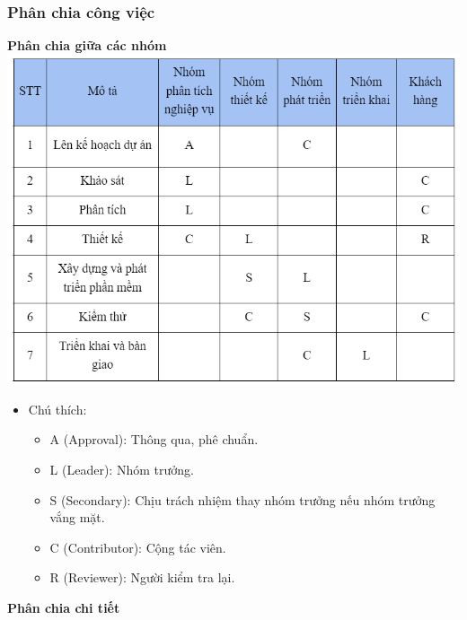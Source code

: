 \documentclass[12pt]{article}
\begin{document}
\subsubsection{Phân chia công việc}
\hspace{1cm}\textbf{Phân chia giữa các nhóm \\}
\includegraphics[width=15cm]{II_6_5_1.png}
\begin{itemize}[label=, leftmargin=1cm]
    \item Chú thích:
    \begin{itemize}[label=1, leftmargin=1cm]
        \item A (Approval): Thông qua, phê chuẩn.
        \item L (Leader): Nhóm trưởng.
        \item S (Secondary): Chịu trách nhiệm thay nhóm trưởng nếu nhóm trưởng vắng mặt.
        \item C (Contributor): Cộng tác viên.
        \item R (Reviewer): Người kiểm tra lại.
    \end{itemize}
\end{itemize}
\vspace{0.5cm}
\hspace{1cm}\textbf{Phân chia chi tiết \\}
\end{document}
